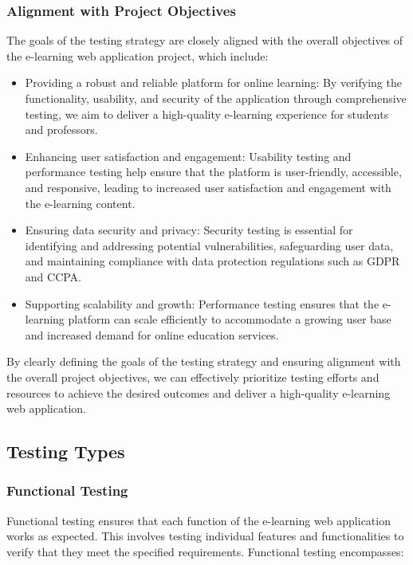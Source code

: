 		\subsubsection{Alignment with Project Objectives}
		
		The goals of the testing strategy are closely aligned with the overall objectives of the e-learning web application project, which include:
		
		\begin{itemize}
			\item Providing a robust and reliable platform for online learning: By verifying the functionality, usability, and security of the application through comprehensive testing, we aim to deliver a high-quality e-learning experience for students and professors.
			\item Enhancing user satisfaction and engagement: Usability testing and performance testing help ensure that the platform is user-friendly, accessible, and responsive, leading to increased user satisfaction and engagement with the e-learning content.
			\item Ensuring data security and privacy: Security testing is essential for identifying and addressing potential vulnerabilities, safeguarding user data, and maintaining compliance with data protection regulations such as GDPR and CCPA.
			\item Supporting scalability and growth: Performance testing ensures that the e-learning platform can scale efficiently to accommodate a growing user base and increased demand for online education services.
		\end{itemize}
		
		By clearly defining the goals of the testing strategy and ensuring alignment with the overall project objectives, we can effectively prioritize testing efforts and resources to achieve the desired outcomes and deliver a high-quality e-learning web application.
		
	\subsection{Testing Types}
		
		\subsubsection{Functional Testing}
		
		Functional testing ensures that each function of the e-learning web application works as expected. This involves testing individual features and functionalities to verify that they meet the specified requirements. Functional testing encompasses:
		
